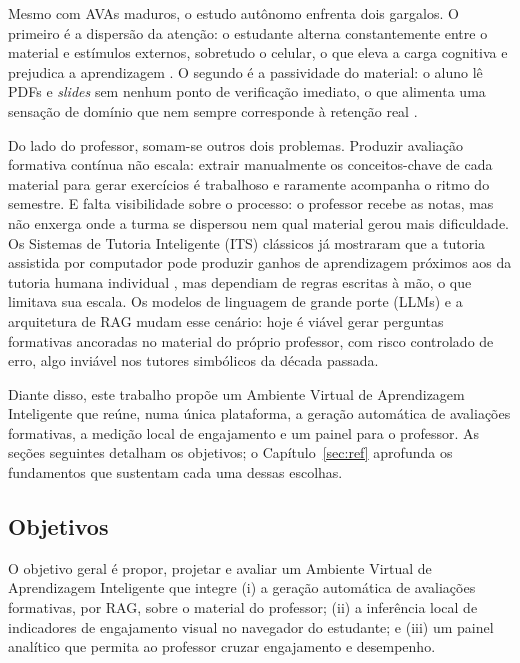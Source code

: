 \documentclass[12pt,a4paper]{article}
\begin{document}
Mesmo com AVAs maduros, o estudo autônomo enfrenta dois gargalos. O primeiro é a dispersão da atenção: o estudante alterna constantemente entre o material e estímulos externos, sobretudo o celular, o que eleva a carga cognitiva e prejudica a aprendizagem \cite{KDB17,Bat19}. O segundo é a passividade do material: o aluno lê PDFs e \emph{slides} sem nenhum ponto de verificação imediato, o que alimenta uma sensação de domínio que nem sempre corresponde à retenção real \cite{DDD17}.

Do lado do professor, somam-se outros dois problemas. Produzir avaliação formativa contínua não escala: extrair manualmente os conceitos-chave de cada material para gerar exercícios é trabalhoso e raramente acompanha o ritmo do semestre. E falta visibilidade sobre o processo: o professor recebe as notas, mas não enxerga onde a turma se dispersou nem qual material gerou mais dificuldade. Os Sistemas de Tutoria Inteligente (ITS) clássicos já mostraram que a tutoria assistida por computador pode produzir ganhos de aprendizagem próximos aos da tutoria humana individual \cite{Van11}, mas dependiam de regras escritas à mão, o que limitava sua escala. Os modelos de linguagem de grande porte (LLMs) \cite{BMR20,ZZL23} e a arquitetura de RAG \cite{LPP20,GXG23} mudam esse cenário: hoje é viável gerar perguntas formativas ancoradas no material do próprio professor, com risco controlado de erro, algo inviável nos tutores simbólicos da década passada.

Diante disso, este trabalho propõe um Ambiente Virtual de Aprendizagem Inteligente que reúne, numa única plataforma, a geração automática de avaliações formativas, a medição local de engajamento e um painel para o professor. As seções seguintes detalham os objetivos; o Capítulo~\ref{sec:ref} aprofunda os fundamentos que sustentam cada uma dessas escolhas.

\subsection{Objetivos}

O objetivo geral é propor, projetar e avaliar um Ambiente Virtual de Aprendizagem Inteligente que integre (i) a geração automática de avaliações formativas, por RAG, sobre o material do professor; (ii) a inferência local de indicadores de engajamento visual no navegador do estudante; e (iii) um painel analítico que permita ao professor cruzar engajamento e desempenho.
\end{document}
